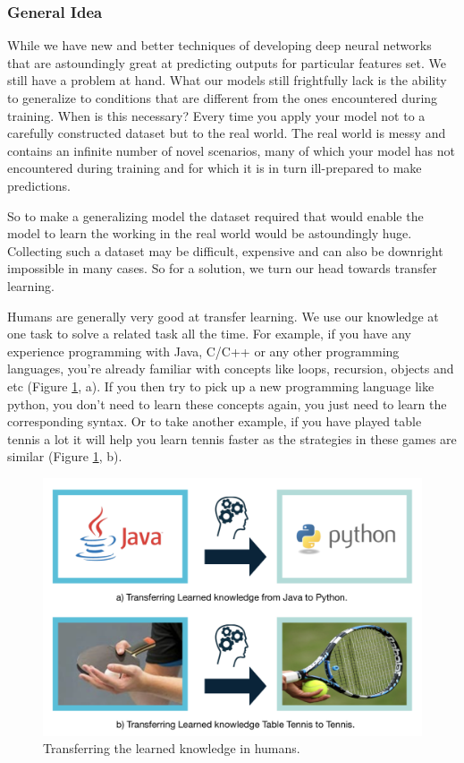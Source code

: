 \documentclass[a4paper, 12pt]{article}
\begin{document}
\begin{sloppypar}
\subsubsection{General Idea}
While we have new and better techniques of developing deep neural networks that are astoundingly great at predicting outputs for particular features set. We still have a problem at hand. What our models still frightfully lack is the ability to generalize to conditions that are different from the ones encountered during training. When is this necessary? Every time you apply your model not to a carefully constructed dataset but to the real world. The real world is messy and contains an infinite number of novel scenarios, many of which your model has not encountered during training and for which it is in turn ill-prepared to make predictions.\cite{noauthor_transfer_2017}

So to make a generalizing model the dataset required that would enable the model to learn the working in the real world would be astoundingly huge. Collecting such a dataset may be difficult, expensive and can also be downright impossible in many cases. So for a solution, we turn our head towards transfer learning.

Humans are generally very good at transfer learning. We use our knowledge at one task to solve a related task all the time. For example, if you have any experience programming with Java, C/C++ or any other programming languages, you’re already familiar with concepts like loops, recursion, objects and etc (Figure \ref{human}, a). If you then try to pick up a new programming language like python, you don't need to learn these concepts again, you just need to learn the corresponding syntax. Or to take another example, if you have played table tennis a lot it will help you learn tennis faster as the strategies in these games are similar (Figure \ref{human}, b).\cite{asgarian_transfer_2019}

\begin{figure}[H]
\begin{center}
\includegraphics[scale=0.25]{human_lt.png}
\caption{Transferring the learned knowledge in humans.\cite{asgarian_transfer_2019}\label{human}}
\end{center}
\end{figure}


\end{sloppypar}
\end{document}
